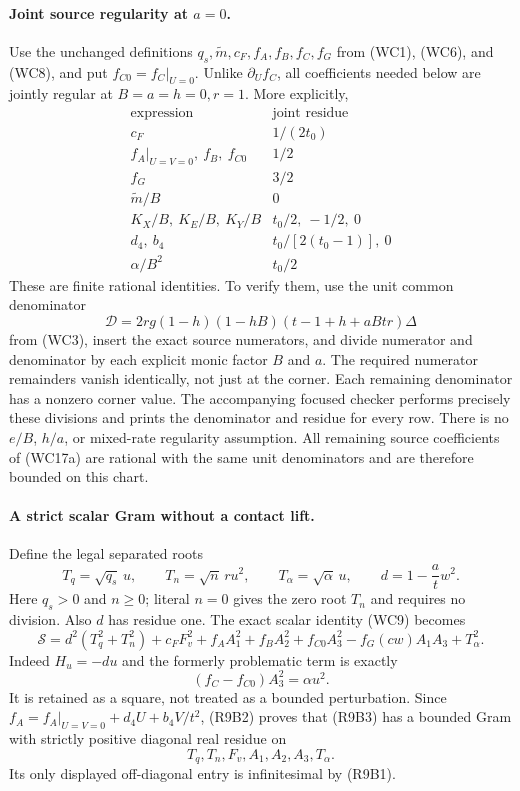 \paragraph{Joint source regularity at $a=0$.}
Use the unchanged definitions $q_s,\widetilde m,c_F,f_A,f_B,f_C,f_G$
from (WC1), (WC6), and (WC8), and put $f_{C0}=f_C|_{U=0}$.
Unlike $\partial_Uf_C$, all coefficients needed below are jointly
regular at $B=a=h=0,r=1$. More explicitly,
\[
\begin{array}{c|c}
\text{expression}&\text{joint residue}\\\hline
c_F&1/(2t_0)\\
f_A|_{U=V=0},\ f_B,\ f_{C0}&1/2\\
f_G&3/2\\
\widetilde m/B&0\\
K_X/B,\ K_E/B,\ K_Y/B&t_0/2,\ -1/2,\ 0\\
d_4,\ b_4&t_0/[2(t_0-1)],\ 0\\
\alpha/B^2&t_0/2
\end{array}                                                   \tag{R9B2}
\]
These are finite rational identities. To verify them, use the
unit common denominator
\[
 \mathcal D=2rg(1-h)(1-hB)(t-1+h+aBtr)\Delta
\]
from (WC3), insert the exact source numerators, and divide numerator
and denominator by each explicit monic factor $B$ and $a$.
The required numerator remainders vanish identically, not just at
the corner. Each remaining denominator has a nonzero corner value.
The accompanying focused checker performs precisely these divisions
and prints the denominator and residue for every row. There is no
$e/B$, $h/a$, or mixed-rate regularity assumption. All remaining
source coefficients of (WC17a) are rational with the same unit
denominators and are therefore bounded on this chart.

\paragraph{A strict scalar Gram without a contact lift.}
Define the legal separated roots
\[
 T_q=\sqrt{q_s}\,u,\qquad T_n=\sqrt n\,r u^2,
 \qquad T_\alpha=\sqrt\alpha\,u,\qquad
 d=1-\frac a t w^2.
\]
Here $q_s>0$ and $n\ge0$; literal $n=0$ gives the zero root
$T_n$ and requires no division. Also $d$ has residue one.
The exact scalar identity (WC9) becomes
\[
 \mathcal S=d^2(T_q^2+T_n^2)+c_FF_v^2
       +f_AA_1^2+f_BA_2^2+f_{C0}A_3^2
       -f_G(cw)A_1A_3+T_\alpha^2.                 \tag{R9B3}
\]
Indeed $H_u=-du$ and the formerly problematic term is exactly
\[
  (f_C-f_{C0})A_3^2=\alpha u^2.
\]
It is retained as a square, not treated as a bounded perturbation.
Since $f_A=f_A|_{U=V=0}+d_4U+b_4V/t^2$, (R9B2) proves that
(R9B3) has a bounded Gram with strictly positive diagonal real
residue on
\[
 T_q,T_n,F_v,A_1,A_2,A_3,T_\alpha.
\]
Its only displayed off-diagonal entry is infinitesimal by (R9B1).

